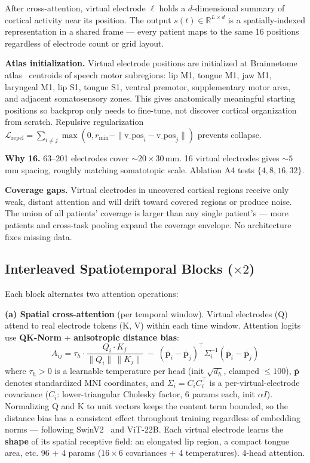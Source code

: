 \documentclass[11pt,letterpaper]{article}
\newcommand{\bfp}{\mathbf{p}}
\newcommand{\R}{\mathbb{R}}
\begin{document}
After cross-attention, virtual electrode $\ell$ holds a $d$-dimensional summary of cortical activity near its position. The output $s(t) \in \R^{L \times d}$ is a spatially-indexed representation in a shared frame --- every patient maps to the same 16 positions regardless of electrode count or grid layout.

\textbf{Atlas initialization.} Virtual electrode positions are initialized at Brainnetome atlas~\cite{fan2016} centroids of speech motor subregions: lip M1, tongue M1, jaw M1, laryngeal M1, lip S1, tongue S1, ventral premotor, supplementary motor area, and adjacent somatosensory zones. This gives anatomically meaningful starting positions so backprop only needs to fine-tune, not discover cortical organization from scratch. Repulsive regularization $\mathcal{L}_{\text{repel}} = \sum_{i \neq j} \max(0, r_{\min} - \|\text{v\_pos}_i - \text{v\_pos}_j\|)$ prevents collapse.

\textbf{Why 16.} 63--201 electrodes cover ${\sim}20 \times 30$\,mm. 16 virtual electrodes gives ${\sim}5$\,mm spacing, roughly matching somatotopic scale. Ablation A4 tests $\{4, 8, 16, 32\}$.

\textbf{Coverage gaps.} Virtual electrodes in uncovered cortical regions receive only weak, distant attention and will drift toward covered regions or produce noise. The union of all patients' coverage is larger than any single patient's --- more patients and cross-task pooling expand the coverage envelope. No architecture fixes missing data.


\subsection{Interleaved Spatiotemporal Blocks ($\times 2$)}\label{sec:interleaved}

Each block alternates two attention operations:

\textbf{(a) Spatial cross-attention} (per temporal window). Virtual electrodes (Q) attend to real electrode tokens (K, V) within each time window. Attention logits use \textbf{QK-Norm} + \textbf{anisotropic distance bias}:
\begin{equation}
A_{ij} = \tau_h \cdot \frac{Q_i \cdot K_j}{\|Q_i\|\,\|K_j\|} \;-\; (\bar{\bfp}_i - \bar{\bfp}_j)^\top \Sigma_i^{-1} (\bar{\bfp}_i - \bar{\bfp}_j)
\end{equation}
where $\tau_h > 0$ is a learnable temperature per head (init $\sqrt{d_h}$, clamped $\leq 100$), $\bar{\bfp}$ denotes standardized MNI coordinates, and $\Sigma_i = C_i C_i^\top$ is a per-virtual-electrode covariance ($C_i$: lower-triangular Cholesky factor, 6 params each, init $\alpha I$). Normalizing Q and K to unit vectors keeps the content term bounded, so the distance bias has a consistent effect throughout training regardless of embedding norms --- following SwinV2~\cite{chen2025} and ViT-22B. Each virtual electrode learns the \textbf{shape} of its spatial receptive field: an elongated lip region, a compact tongue area, etc. 96 + 4 params ($16 \times 6$ covariances $+$ 4 temperatures). 4-head attention.
\end{document}
